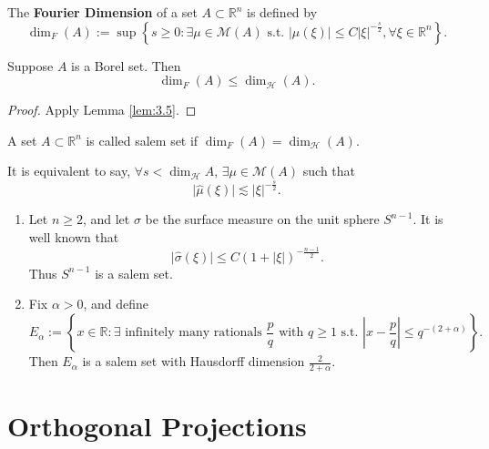 \begin{definition}\label{def:fourier_dimension}
The \textbf{Fourier Dimension} of a set $A\subset \mathbb{R}^{n}$ is defined by
$$
\dim_{F}(A):=\sup\left\{  s\geq0: \exists \mu \in \mathcal{M}(A) \text{ s.t. } \lvert \hat{\mu}(\xi) \rvert \leq C\lvert \xi \rvert ^{-\frac{s}{2}},\forall \xi \in \mathbb{R}^{n}  \right\}.
$$
\end{definition}

\begin{theorem}\label{thm:3.6}
Suppose $A$ is a Borel set. Then
$$
\operatorname{dim}_{F}(A)\leq \operatorname{dim}_{\mathcal{H}}(A).
$$
\end{theorem}
\begin{proof}
Apply Lemma \ref{lem:3.5}.
\end{proof}

\begin{definition}\label{def:salem_set}
A set $A\subset \mathbb{R}^{n}$ is called salem set if $\operatorname{dim}_{F}(A)=\operatorname{dim}_{\mathcal{H}}(A)$.
\end{definition}

\begin{remark}\label{rmk:salem_condition}
It is equivalent to say, $\forall s <\operatorname{dim}_{\mathcal{H}}A$, $\exists \mu \in \mathcal{M}(A)$ such that
$$
\lvert \hat{\mu}(\xi) \rvert \lesssim \lvert \xi \rvert ^{-\frac{s}{2}}.
$$
\end{remark}

\begin{example}\label{ex:salem_examples}
\begin{enumerate}[label=(\roman*)]
    \item Let $n\geq 2$, and let $\sigma$ be the surface measure on the unit sphere $S^{n-1}$. It is well known that $$\lvert \hat{\sigma}(\xi) \rvert \leq C(1+\lvert \xi \rvert )^{-\frac{n-1}{2}}.$$Thus $S^{n-1}$ is a salem set.
    \item Fix $\alpha>0$, and define $$E_{\alpha}:=\left\{  x \in \mathbb{R}: \exists \text{ infinitely many rationals } \frac{p}{q} \text{ with } q\geq 1\text{ s.t. } \left\lvert  x-\frac{p}{q}  \right\rvert \leq q^{-(2+\alpha)}  \right\}.$$Then $E_{\alpha}$ is a salem set with Hausdorff dimension $\frac{2}{2+\alpha}$.
\end{enumerate}
\end{example}

\section{Orthogonal Projections}

